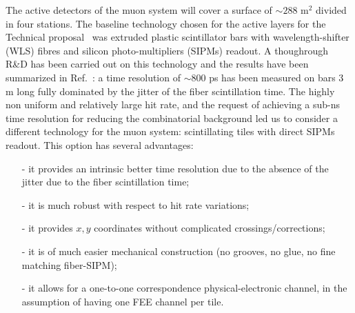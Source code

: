 The active detectors of the muon system will cover a surface of $\sim 288 $ m$^2$ divided in four stations.
The baseline technology chosen for the active layers for the Technical proposal~\cite{Anelli:2015pba}
was extruded plastic scintillator bars with wavelength-shifter (WLS) fibres 
and silicon photo-multipliers (SIPMs) readout. A thoughrough R\&D has been carried out on this technology and the results
have been summarized in Ref.~\cite{Montanari:2016rmo}: a time resolution of $\sim$800 ps has been measured on bars 3 m long
fully dominated by the jitter of the fiber scintillation time.
The highly non uniform and relatively large hit rate, and the request of achieving
a sub-ns time resolution for reducing the combinatorial background led us to consider a different technology
for the muon system: scintillating tiles with direct SIPMs readout.
This option has several advantages:
\begin{itemize}
\item[-] it provides an intrinsic better time resolution due to the absence of the jitter due to the fiber scintillation time;
\item[-] it is much robust with respect to hit rate variations;
\item[-] it provides $x,y$ coordinates without complicated crossings/corrections;
\item[-] it is of much easier mechanical construction (no grooves, no glue, no fine matching fiber-SIPM);
\item[-] it allows for a one-to-one correspondence physical-electronic channel, in the assumption of having one
  FEE channel per tile.
\end{itemize}

